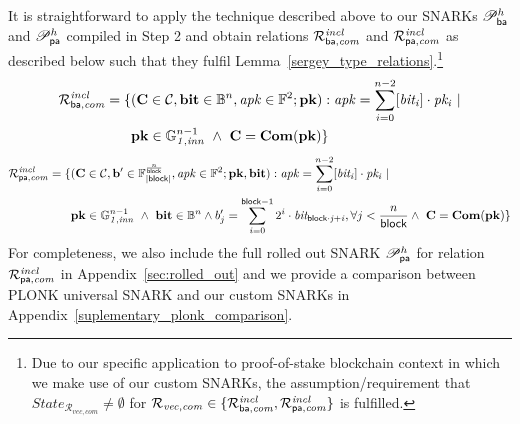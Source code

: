 \noindent It is straightforward to apply the technique described above to our SNARKs $\mathscr{P}_{\mathsf{ba}}^{h}$ and $\mathscr{P}_{\mathsf{pa}}^{h}$ 
compiled in Step 2 and obtain relations $\mathcal{R}^{\mathit{incl}}_{\mathsf{ba},\mathit{com}}$ and $\mathcal{R}^{\mathit{incl}}_{\mathsf{pa},\mathit{com}}$ as described below such that they fulfil Lemma~\ref{sergey_type_relations}.\footnote{Due to our specific application to proof-of-stake blockchain context in which we make use of our custom SNARKs, 
the assumption/requirement that  $\mathit{State}_{\mathcal{R}_{\mathit{vec}, \mathit{com}}} \neq \emptyset$ for 
$\mathcal{R}_{\mathit{vec}, \mathit{com}} \in \{\mathcal{R}^{\mathit{incl}}_{\mathsf{ba},\mathit{com}}, \mathcal{R}^{\mathit{incl}}_{\mathsf{pa},\mathit{com}} \}$ is fulfilled.}
\begin{align*}
 {\mathcal{R}^{\mathit{incl}}_{\mathsf{ba},\mathit{com}}} = \{ & (\mathbf{C} \in \mathcal{C}, \mathbf{bit} \in \mathbb{B}^n, \mathit{apk} \in \mathbb{F}^2; \mathbf{pk}) : \mathit{apk} = \sum_{i=0}^{n-2} [\mathit{bit_i}] \cdot \mathit{pk_i} \ | \\ 
& \mathbf{pk} \in \mathbb{G}_{\mathit{1,inn}}^{n-1} \ \wedge \  \mathbf{C} = \mathbf{Com}(\mathbf{pk}) \} 
\end{align*}
\begin{align*}
 {\mathcal{R}^{\mathit{incl}}_{\mathsf{pa},\mathit{com}}}  = \{ & (\mathbf{C} \in \mathcal{C}, \mathbf{b'} \in \mathbb{F}_{|\mathsf{block}|}^{\frac{n}{\mathsf{block}}}, \mathit{apk} \in \mathbb{F}^2;\mathbf{pk}, \mathbf{bit}) : \mathit{apk} = \sum_{i=0}^{n-2} [\mathit{bit_i}] \cdot \mathit{pk_i} \ | \\ 
& \mathbf{pk} \in \mathbb{G}_{\mathit{1,inn}}^{n-1} \ \wedge \ \mathbf{bit} \in \mathbb{B}^n  \wedge b'_{j} = \sum_{i=0}^{\mathsf{block} -1}2^i \cdot \mathit{bit_{\mathsf{block} \cdot j + i}}, \forall j < \frac{n}{\mathsf{block}}  \wedge \  \mathbf{C} = \mathbf{Com}(\mathbf{pk}) \} 
\end{align*}
For completeness, we also include the full rolled out SNARK $\mathscr{P}_{\mathsf{pa}}^{h}$ for relation $\mathcal{R}^{\mathit{incl}}_{\mathsf{pa},\mathit{com}}$ in Appendix~\ref{sec:rolled_out} and we provide a comparison between PLONK universal 
SNARK and our custom SNARKs in Appendix~\ref{suplementary_plonk_comparison}.  
